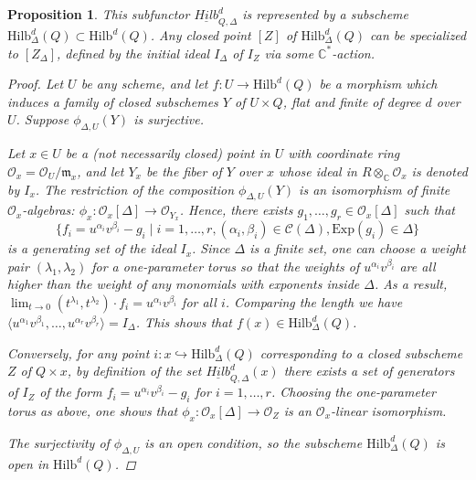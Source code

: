 \documentclass{amsart}[12pt]
\newtheorem{prop}[theorem]{Proposition}
\theoremstyle{definition}
\theoremstyle{remark}
\numberwithin{equation}{section}
\newcommand{\To}{\longrightarrow}
\begin{document}
\begin{prop}
This subfunctor $\underline{Hilb}^d_{Q, \Delta}$ is represented by a subscheme $\mathrm{Hilb}^d_{\Delta}(Q) \subset \mathrm{Hilb}^d(Q)$. Any closed point $[Z]$ of $\mathrm{Hilb}^d_{\Delta}(Q)$ can be specialized to $[Z_{\Delta}]$, defined by the initial ideal $I_{\Delta}$ of $I_Z$ via some $\mathbb{C}^*$-action.
\begin{proof}
Let $U$ be any scheme, and let $f: U \To \mathrm{Hilb}^d(Q)$ be a morphism which induces a family of closed subschemes $Y$ of $U \times Q$, flat and finite of degree $d$ over $U$. Suppose $\phi_{\Delta, U}(Y)$ is surjective. 

Let $x \in U$ be a (not necessarily closed) point in $U$ with coordinate ring $\mathcal{O}_x = \mathcal{O}_U/\mathfrak{m}_x$, and let $Y_x$ be the fiber of $Y$ over $x$ whose ideal in $R \otimes_{\mathbb{C}} \mathcal{O}_x$ is denoted by $I_x$. The restriction of the composition $\phi_{\Delta, U}(Y)$ is an isomorphism of finite $\mathcal{O}_x$-algebras: $\phi_x: \mathcal{O}_x[\Delta] \To \mathcal{O}_{Y_{x}}$. Hence, there exists $g_1, \dots, g_r \in \mathcal{O}_x[\Delta]$ such that
\[
\{f_i = u^{\alpha_i}v^{\beta_i} - g_i \mid i = 1, \dots, r, (\alpha_i, \beta_i) \in \mathcal{C}(\Delta), \mathrm{Exp}(g_i) \in \Delta\}
\]
is a generating set of the ideal $I_x$. Since $\Delta$ is a finite set, one can choose a weight pair $(\lambda_1, \lambda_2)$ for a one-parameter torus so that the weights of $u^{\alpha_i}v^{\beta_i}$ are all higher than the weight of any monomials with exponents inside $\Delta$. As a result, $\lim_{t \to 0}(t^{\lambda_1}, t^{\lambda_2})\cdot f_i = u^{\alpha_i}v^{\beta_i}$ for all $i$. Comparing the length we have $\langle u^{\alpha_1}v^{\beta_1}, \dots, u^{\alpha_r}v^{\beta_r}\rangle = I_{\Delta}$. This shows that $f(x) \in \mathrm{Hilb}^d_{\Delta}(Q)$.

Conversely, for any point $i: x \hookrightarrow \mathrm{Hilb}^d_{\Delta}(Q)$ corresponding to a closed subscheme $Z$ of $Q \times x$, by definition of the set $\underline{Hilb}^d_{Q, \Delta}(x)$ there exists a set of generators of $I_Z$ of the form $f_i = u^{\alpha_i}v^{\beta_i} - g_i$ for $i = 1, \dots, r$. Choosing the one-parameter torus as above, one shows that $\phi_x: \mathcal{O}_x[\Delta] \to \mathcal{O}_Z$ is an $\mathcal{O}_x$-linear isomorphism.

The surjectivity of $\phi_{\Delta, U}$ is an open condition, so the subscheme $\mathrm{Hilb}^d_{\Delta}(Q)$ is open in $\mathrm{Hilb}^d(Q)$. 
\end{proof}
\end{prop}
\end{document}
